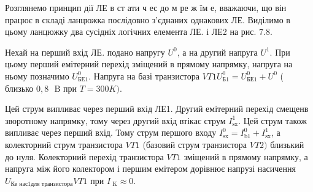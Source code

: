 \documentclass[a4paper,14pt]{extreport}
\begin{document}
  Розглянемо принцип дії ЛЕ в ст ати ч ес до м ре ж їм е, вважаючи, що він працює в складі ланцюжка послідовно з'єднаних однакових ЛЕ. Виділимо в цьому ланцюжку два сусідніх логічних елемента ЛЕ. і ЛЕ2 на рис. $ 7.8. $
    \begin{figure}[!h]
  \end{figure}

  Нехай на перший вхід ЛЕ. подано напругу $ U^{0} $, а на другий напруга $ U^{1}. $ При цьому перший емітерний перехід зміщений в прямому напрямку, напруга на ньому позначимо $ U _{\text {БЕ1}}^{0}. $ Напруга на базі транзистора $ VT1 U _{\text {Б1}}^{0} =
   U _{\text {БЕ1}}^{0} + U^{0} $ ( близько $ 0,8 \text{~ B} $ при $ T=300 K)$.
     \begin{figure}[!h]
  \end{figure}

  Цей струм випливає через перший вхід ЛЕ1. Другий емітерний перехід смещенв зворотному напрямку, тому через другий вхід втікає струм $ I _ {\text{sx}} ^ {1}. $ Цей струм також випливає через перший вхід. Тому струм першого входу $ I _ {\text{sx}} ^ {0} = I _ {\text{b} 1} ^ {0} + I _ {\text{sx}} ^ {1} $, а колекторний струм транзистора $ VT 1 $ (базовий струм транзистора $ VT 2) $ близький до нуля. Колекторний перехід транзистора $ VT 1 $ зміщений в прямому напрямку, а напруга між його колектором і першим емітером дорівнює напрузі насичення $ U _ {\text {Ке нас} 1 \text {для транзистора}} VT 1 $ при $ I _ {\text{ K}} \approx 0. $
\end{document}
